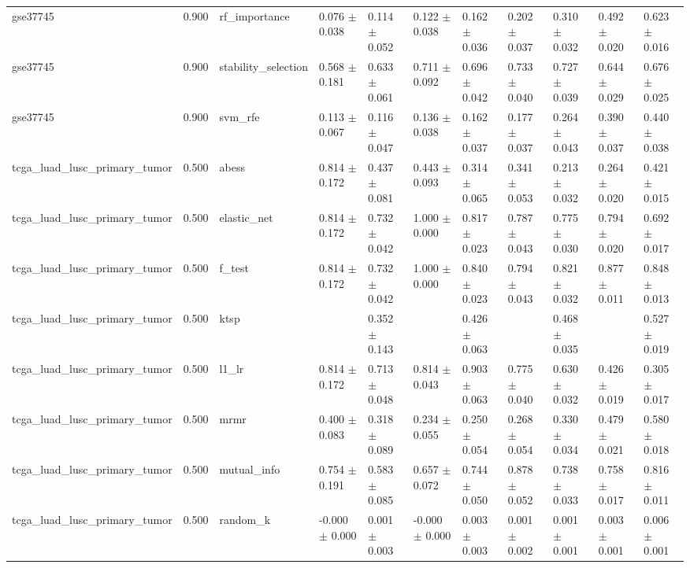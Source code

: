 \begin{table}[t]
\begin{tabular}{lllllllllll}
    gse37745 & 0.900 & rf\_importance & 0.076 $\pm$ 0.038 & 0.114 $\pm$ 0.052 & 0.122 $\pm$ 0.038 & 0.162 $\pm$ 0.036 & 0.202 $\pm$ 0.037 & 0.310 $\pm$ 0.032 & 0.492 $\pm$ 0.020 & 0.623 $\pm$ 0.016 \\
    gse37745 & 0.900 & stability\_selection & 0.568 $\pm$ 0.181 & 0.633 $\pm$ 0.061 & 0.711 $\pm$ 0.092 & 0.696 $\pm$ 0.042 & 0.733 $\pm$ 0.040 & 0.727 $\pm$ 0.039 & 0.644 $\pm$ 0.029 & 0.676 $\pm$ 0.025 \\
    gse37745 & 0.900 & svm\_rfe & 0.113 $\pm$ 0.067 & 0.116 $\pm$ 0.047 & 0.136 $\pm$ 0.038 & 0.162 $\pm$ 0.037 & 0.177 $\pm$ 0.037 & 0.264 $\pm$ 0.043 & 0.390 $\pm$ 0.037 & 0.440 $\pm$ 0.038 \\
    tcga\_luad\_lusc\_primary\_tumor & 0.500 & abess & 0.814 $\pm$ 0.172 & 0.437 $\pm$ 0.081 & 0.443 $\pm$ 0.093 & 0.314 $\pm$ 0.065 & 0.341 $\pm$ 0.053 & 0.213 $\pm$ 0.032 & 0.264 $\pm$ 0.020 & 0.421 $\pm$ 0.015 \\
    tcga\_luad\_lusc\_primary\_tumor & 0.500 & elastic\_net & 0.814 $\pm$ 0.172 & 0.732 $\pm$ 0.042 & 1.000 $\pm$ 0.000 & 0.817 $\pm$ 0.023 & 0.787 $\pm$ 0.043 & 0.775 $\pm$ 0.030 & 0.794 $\pm$ 0.020 & 0.692 $\pm$ 0.017 \\
    tcga\_luad\_lusc\_primary\_tumor & 0.500 & f\_test & 0.814 $\pm$ 0.172 & 0.732 $\pm$ 0.042 & 1.000 $\pm$ 0.000 & 0.840 $\pm$ 0.023 & 0.794 $\pm$ 0.043 & 0.821 $\pm$ 0.032 & 0.877 $\pm$ 0.011 & 0.848 $\pm$ 0.013 \\
    tcga\_luad\_lusc\_primary\_tumor & 0.500 & ktsp &  & 0.352 $\pm$ 0.143 &  & 0.426 $\pm$ 0.063 &  & 0.468 $\pm$ 0.035 &  & 0.527 $\pm$ 0.019 \\
    tcga\_luad\_lusc\_primary\_tumor & 0.500 & l1\_lr & 0.814 $\pm$ 0.172 & 0.713 $\pm$ 0.048 & 0.814 $\pm$ 0.043 & 0.903 $\pm$ 0.063 & 0.775 $\pm$ 0.040 & 0.630 $\pm$ 0.032 & 0.426 $\pm$ 0.019 & 0.305 $\pm$ 0.017 \\
    tcga\_luad\_lusc\_primary\_tumor & 0.500 & mrmr & 0.400 $\pm$ 0.083 & 0.318 $\pm$ 0.089 & 0.234 $\pm$ 0.055 & 0.250 $\pm$ 0.054 & 0.268 $\pm$ 0.054 & 0.330 $\pm$ 0.034 & 0.479 $\pm$ 0.021 & 0.580 $\pm$ 0.018 \\
    tcga\_luad\_lusc\_primary\_tumor & 0.500 & mutual\_info & 0.754 $\pm$ 0.191 & 0.583 $\pm$ 0.085 & 0.657 $\pm$ 0.072 & 0.744 $\pm$ 0.050 & 0.878 $\pm$ 0.052 & 0.738 $\pm$ 0.033 & 0.758 $\pm$ 0.017 & 0.816 $\pm$ 0.011 \\
    tcga\_luad\_lusc\_primary\_tumor & 0.500 & random\_k & -0.000 $\pm$ 0.000 & 0.001 $\pm$ 0.003 & -0.000 $\pm$ 0.000 & 0.003 $\pm$ 0.003 & 0.001 $\pm$ 0.002 & 0.001 $\pm$ 0.001 & 0.003 $\pm$ 0.001 & 0.006 $\pm$ 0.001 \\

\end{tabular}
\end{table}
